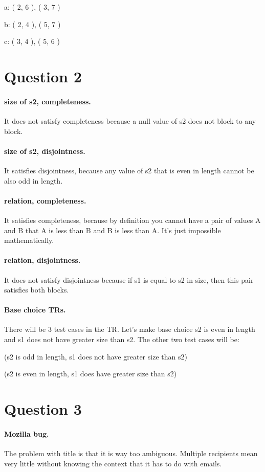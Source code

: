 \documentclass[12pt]{article}
\begin{document}
a: ( 2, 6 ), ( 3, 7 )

b: ( 2, 4 ), ( 5, 7 )

c: ( 3, 4 ), ( 5, 6 )


\section*{Question 2}
\paragraph{size of s2, completeness.} 
It does not satisfy completeness because a null value of s2 does not block to any block.

\paragraph{size of s2, disjointness.} 
It satisfies disjointness, because any value of s2 that is even in length cannot be also odd in length.

\paragraph{relation, completeness.} 
It satisfies completeness, because by definition you cannot have a pair of values A and B that A is less than B and B is less than A. It's just impossible mathematically.

\paragraph{relation, disjointness.}
It does not satisfy disjointness because if s1 is equal to s2 in size, then this pair satisfies both blocks.


\paragraph{Base choice TRs.}
There will be 3 test cases in the TR.
Let's make base choice s2 is even in length and s1 does not have greater size than s2.
The other two test cases will be:

(s2 is odd in length, s1 does not have greater size than s2)

(s2 is even in length, s1 does have greater size than s2)

\section*{Question 3}
\paragraph{Mozilla bug.}
The problem with title is that it is way too ambiguous. Multiple recipients mean very little without knowing the context that it has to do with emails.
\end{document}

